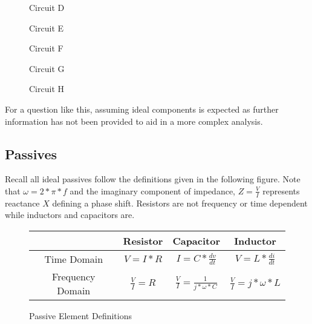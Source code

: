 \documentclass[main.tex]{subfiles}
\begin{document}
\begin{figure}[h!]
    \begin{center}
        \begin{circuitikz}[american]
            \label{fig:rc_high_pass_filter}
        \end{circuitikz}
        \caption{Circuit D}
    \end{center}
\end{figure}

\begin{figure}[h!]
    \caption{Circuit E}
    \label{fig:c_current_source}
\end{figure}

\begin{figure}[h!]
    \caption{Circuit F}
    \label{fig:rc_current_source}
\end{figure}

\begin{figure}[h!]
    \caption{Circuit G}
    \label{fig:lseries_cshunt} 
\end{figure}

\begin{figure}[h!]
    \caption{Circuit H}
    \label{fig:lseries_cseries} 
\end{figure}

\spoilerline

\noindent For a question like this, assuming ideal components is expected as further information has not been provided to aid in a more complex analysis.

\subsection{Passives}
Recall all ideal passives follow the definitions given in the following figure. Note that $\omega = 2 * \pi * f$ and the imaginary component of impedance, $Z = \frac{V}{I}$ represents reactance $X$ defining a phase shift. Resistors are not frequency or time dependent while inductors and capacitors are. 
\begin{figure}[h!]
    \centering
    \begin{tabular}{|c|c|c|c|}
        \hline
         & Resistor & Capacitor & Inductor \\ \hline
        Time Domain & $V = I * R$ & $I = C * \frac{dv}{dt}$ & $V = L * \frac{di}{dt}$ \\ \hline
        Frequency Domain & $\frac{V}{I} = R$ & $\frac{V}{I} = \frac{1}{j*\omega*C}$ & $\frac{V}{I} = j*\omega*L$ \\ \hline
    \end{tabular}
    \caption{Passive Element Definitions}
    \label{fig:passive definitions}
\end{figure}
\end{document}

